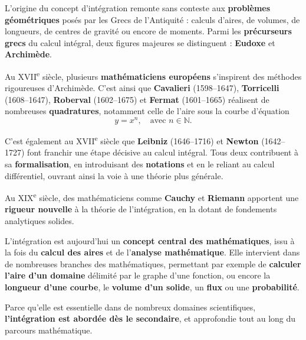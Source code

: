 
\everymath{\displaystyle}


L’origine du concept d’intégration remonte sans conteste aux \textbf{problèmes géométriques} posés par les Grecs de l’Antiquité : calculs d’aires, de volumes, de longueurs, de centres de gravité ou encore de moments. Parmi les \textbf{précurseurs grecs} du calcul intégral, deux figures majeures se distinguent : \textbf{Eudoxe} et \textbf{Archimède}.

Au XVII\textsuperscript{e} siècle, plusieurs \textbf{mathématiciens européens} s’inspirent des méthodes rigoureuses d’Archimède. C’est ainsi que \textbf{Cavalieri} (1598--1647), \textbf{Torricelli} (1608--1647), \textbf{Roberval} (1602--1675) et \textbf{Fermat} (1601--1665) réalisent de nombreuses \textbf{quadratures}, notamment celle de l’aire sous la courbe d’équation 
\[ 
y = x^n, \quad \text{avec } n \in \mathbb{N}.
\]

C’est également au XVII\textsuperscript{e} siècle que \textbf{Leibniz} (1646--1716) et \textbf{Newton} (1642--1727) font franchir une étape décisive au calcul intégral. Tous deux contribuent à sa \textbf{formalisation}, en introduisant des \textbf{notations} et en le reliant au calcul différentiel, ouvrant ainsi la voie à une théorie plus générale.

Au XIX\textsuperscript{e} siècle, des mathématiciens comme \textbf{Cauchy} et \textbf{Riemann} apportent une \textbf{rigueur nouvelle} à la théorie de l’intégration, en la dotant de fondements analytiques solides.

L’intégration est aujourd’hui un \textbf{concept central des mathématiques}, issu à la fois du \textbf{calcul des aires} et de l’\textbf{analyse mathématique}. Elle intervient dans de nombreuses branches des mathématiques, permettant par exemple de \textbf{calculer l’aire d’un domaine} délimité par le graphe d’une fonction, ou encore la \textbf{longueur d’une courbe}, le \textbf{volume d’un solide}, un \textbf{flux} ou une \textbf{probabilité}.

Parce qu’elle est essentielle dans de nombreux domaines scientifiques, \textbf{l’intégration est abordée dès le secondaire}, et approfondie tout au long du parcours mathématique.

